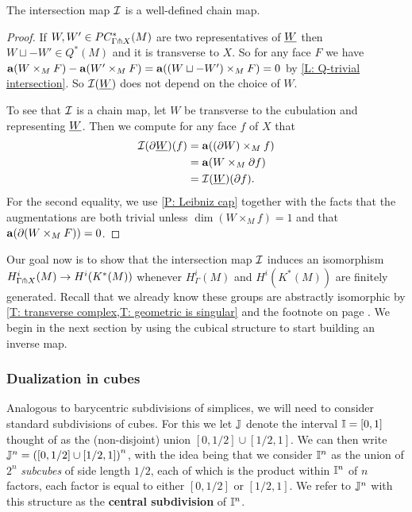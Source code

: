 \begin{proposition}
The intersection map $\mathcal{I}$ is a well-defined chain map.
\end{proposition}
\begin{proof}
If $W, W' \in PC^*_{\Gamma\pitchfork X}(M)$ are two representatives of $\underline{W}$ then $W \sqcup -W' \in Q^*(M)$ and it is transverse to $X$. So for any face $F$ we have $\mathbf{a}(W \times_M F)-\mathbf{a}(W' \times_M F) = \mathbf{a}((W \sqcup -W') \times_M F) = 0$ by \cref{L: Q-trivial intersection}. So $\mathcal{I}(\underline{W})$ does not depend on the choice of $W$.

To see that $\mathcal{I}$ is a chain map, let $W$ be transverse to the cubulation and representing $\underline{W}$. Then we compute for any face $f$ of $X$ that
\begin{align*}
\mathcal{I}(\partial\underline{W})(f)& = \mathbf{a}((\partial W) \times_M f)\\
& = \mathbf{a}(W \times_M \partial f)\\
& = \mathcal{I}(\underline{W})(\partial f).
\end{align*}
For the second equality, we use \cref{P: Leibniz cap} together with the facts that the augmentations are both trivial unless $\dim(W \times_M f) = 1$ and that $\mathbf{a}(\partial (W \times_M F)) = 0$.
\end{proof}

Our goal now is to show that the intersection map $\mathcal{I}$ induces an isomorphism $H^i_{\Gamma \pitchfork X}(M) \to H^i(K^*(M))$ whenever $H^i_\Gamma(M)$ and $H^i(K^*(M))$ are finitely generated. Recall that we already know these groups are abstractly isomorphic by \cref{T: transverse complex,T: geometric is singular} and the footnote on page \pageref{FN: cubical and singular}. We begin in the next section by using the cubical structure to start building an inverse map.

\subsubsection{Dualization in cubes}\label{S: dual cubes}

Analogous to barycentric subdivisions of simplices, we will need to consider standard subdivisions of cubes. For this we let $\mathbb{J}$ denote the interval $\mathbb{I} = [0,1]$ thought of as the (non-disjoint) union $[0,1/2] \cup [1/2,1]$. We can then write $\mathbb{J}^n = \left([0,1/2] \cup [1/2,1]\right)^n$, with the idea being that we consider $\mathbb{I}^n$ as the union of $2^n$ \textit{subcubes} of side length $1/2$, each of which is the product within $\mathbb{I}^n$ of $n$ factors, each factor is equal to either $[0,1/2]$ or $[1/2,1]$. We refer to $\mathbb{J}^n$ with this structure as the \textbf{central subdivision} of $\mathbb{I}^n$.

